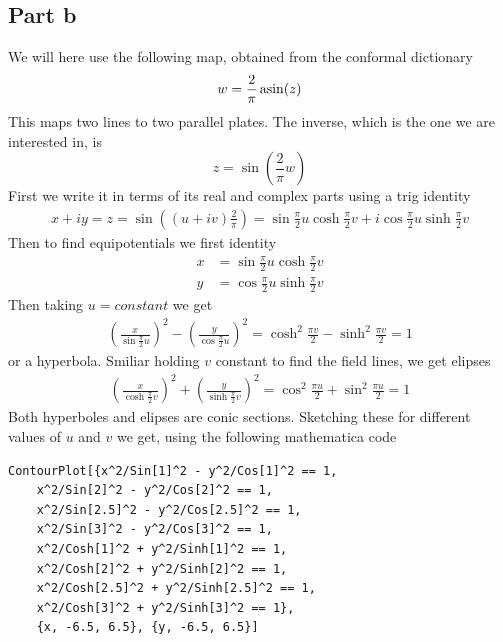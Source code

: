 \documentclass[a4paper,12pt]{article}
\begin{document}
\subsection*{Part b}
We will here use the following map, obtained from the conformal dictionary
\begin{equation}
w=\frac{2}{\pi}\asin(z)
\end{equation}
This maps two lines to two parallel plates. The inverse, which is the one we are interested in, is
\begin{equation}
	z=\sin(\frac{2}{\pi}w)
\end{equation}
First we write it in terms of its real and complex parts using a trig identity
\begin{equation}
\begin{aligned}
	x+iy=z=\sin((u+iv)\frac{2}{\pi})=\sin\frac{\pi}{2}u\cosh\frac{\pi}{2}v+i\cos\frac{\pi}{2}u\sinh\frac{\pi}{2}v
\end{aligned}
\end{equation}
Then to find equipotentials we first identity
\begin{equation}
\begin{aligned}
x&=\sin\frac{\pi}{2}u\cosh\frac{\pi}{2}v\\
y&=\cos\frac{\pi}{2}u\sinh\frac{\pi}{2}v
\end{aligned}
\end{equation}
Then taking $u=constant$ we get
\begin{equation}
	\begin{aligned}
		\left(\frac{x}{\sin\frac{\pi}{2}u}\right)^2-\left(\frac{y}{\cos\frac{\pi}{2}u}\right)^2=\cosh^2\frac{\pi v}{2}-\sinh^2\frac{\pi v}{2}=1
	\end{aligned}
\end{equation}
or a hyperbola. Smiliar holding $v$ constant to find the field lines, we get elipses
\begin{equation}
	\begin{aligned}
		\left(\frac{x}{\cosh\frac{\pi}{2}v}\right)^2+\left(\frac{y}{\sinh\frac{\pi}{2}v}\right)^2=\cos^2\frac{\pi u}{2}+\sin^2\frac{\pi u}{2}=1
	\end{aligned}
\end{equation}
Both hyperboles and elipses are conic sections. Sketching these for different values of $u$ and $v$ we get, using the following mathematica code
\begin{lstlisting}
ContourPlot[{x^2/Sin[1]^2 - y^2/Cos[1]^2 == 1, 
	x^2/Sin[2]^2 - y^2/Cos[2]^2 == 1, 
	x^2/Sin[2.5]^2 - y^2/Cos[2.5]^2 == 1, 
	x^2/Sin[3]^2 - y^2/Cos[3]^2 == 1, 
	x^2/Cosh[1]^2 + y^2/Sinh[1]^2 == 1, 
	x^2/Cosh[2]^2 + y^2/Sinh[2]^2 == 1, 
	x^2/Cosh[2.5]^2 + y^2/Sinh[2.5]^2 == 1, 
	x^2/Cosh[3]^2 + y^2/Sinh[3]^2 == 1},
 	{x, -6.5, 6.5}, {y, -6.5, 6.5}]
\end{lstlisting}
\end{document}
